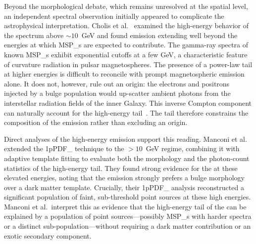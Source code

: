 Beyond the morphological debate, which remains unresolved at the spatial level, an independent spectral observation initially appeared to complicate the astrophysical interpretation.
Cholis et al.~\cite{Cholis:2021rpp} examined the high-energy behavior of the \GCE spectrum above $\sim 10$~GeV and found emission extending well beyond the energies at which \glspl{MSP_} are expected to contribute.
The gamma-ray spectra of known \glspl{MSP_} exhibit exponential cutoffs at a few GeV, a characteristic feature of curvature radiation in pulsar magnetospheres.
The presence of a power-law tail at higher energies is difficult to reconcile with prompt magnetospheric emission alone.
It does not, however, rule out an \MSP origin: the electrons and positrons injected by a bulge \MSP population would up-scatter ambient photons from the interstellar radiation fields of the inner Galaxy.
This inverse Compton component can naturally account for the high-energy tail~\cite{Song:2019nrx}.
The tail therefore constrains the composition of the \MSP emission rather than excluding an \MSP origin.

Direct analyses of the high-energy emission support this reading.
Manconi et al.~\cite{manconi2024galacticcenterexcesshighest} extended the \gls{1pPDF_} technique to the $>10$~GeV regime, combining it with adaptive template fitting to evaluate both the morphology and the photon-count statistics of the high-energy tail.
They found strong evidence for the \GCE at these elevated energies, noting that the emission strongly prefers a bulge morphology over a dark matter template.
Crucially, their \gls{1pPDF_} analysis reconstructed a significant population of faint, sub-threshold point sources at these high energies.
Manconi et al.\ interpret this as evidence that the high-energy tail of the \GCE can be explained by a population of point sources---possibly \glspl{MSP_} with harder spectra or a distinct sub-population---without requiring a dark matter contribution or an exotic secondary component.



